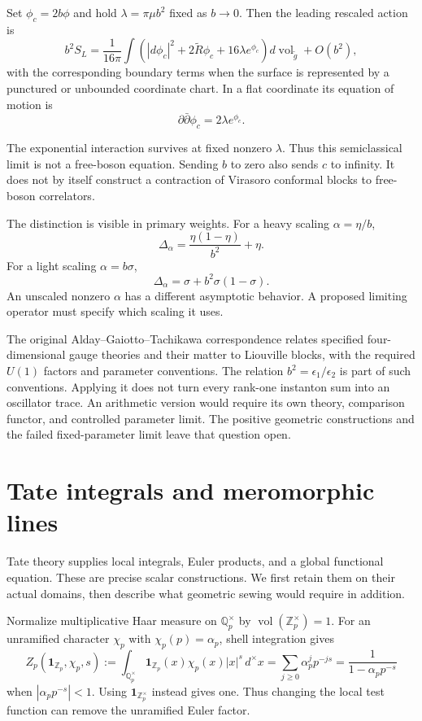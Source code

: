Set $\phi_c=2b\phi$ and hold $\lambda=\pi\mu b^2$ fixed as $b\to0$. Then the
leading rescaled action is
\[
 b^2S_L=
 \frac1{16\pi}\int
   \left(|d\phi_c|^2+2\widetilde R\phi_c+
                    16\lambda e^{\phi_c}\right)
                   d\operatorname{vol}_{\widetilde g}
   +O(b^2),
\]
with the corresponding boundary terms when the surface is represented by a
punctured or unbounded coordinate chart. In a flat coordinate its equation
of motion is
\[
 \partial\bar\partial\phi_c=2\lambda e^{\phi_c}.
\]

The exponential interaction survives at fixed nonzero $\lambda$. Thus this
semiclassical limit is not a free-boson equation. Sending $b$ to zero also
sends $c$ to infinity. It does not by itself construct a contraction of
Virasoro conformal blocks to free-boson correlators.

The distinction is visible in primary weights. For a heavy scaling
$\alpha=\eta/b$,
\[
 \Delta_\alpha=\frac{\eta(1-\eta)}{b^2}+\eta.
\]
For a light scaling $\alpha=b\sigma$,
\[
 \Delta_\alpha=\sigma+b^2\sigma(1-\sigma).
\]
An unscaled nonzero $\alpha$ has a different asymptotic behavior. A proposed
limiting operator must specify which scaling it uses.

The original Alday--Gaiotto--Tachikawa correspondence relates specified
four-dimensional gauge theories and their matter to Liouville blocks, with
the required $U(1)$ factors and parameter conventions. The relation
$b^2=\epsilon_1/\epsilon_2$ is part of such conventions. Applying it does
not turn every rank-one instanton sum into an oscillator trace. An
arithmetic version would require its own theory, comparison functor, and
controlled parameter limit. The positive geometric constructions and the
failed fixed-parameter limit leave that question open.

\section{Tate integrals and meromorphic lines}

Tate theory supplies local integrals, Euler products, and a global
functional equation. These are precise scalar constructions. We first retain
them on their actual domains, then describe what geometric sewing would
require in addition.

Normalize multiplicative Haar measure on $\mathbb Q_p^\times$ by
$\operatorname{vol}(\mathbb Z_p^\times)=1$. For an unramified character
$\chi_p$ with $\chi_p(p)=\alpha_p$, shell integration gives
\[
 Z_p(\mathbf1_{\mathbb Z_p},\chi_p,s)
  :=\int_{\mathbb Q_p^\times}
       \mathbf1_{\mathbb Z_p}(x)\chi_p(x)|x|^s\,d^\times x
  =\sum_{j\geq0}\alpha_p^jp^{-js}
  =\frac1{1-\alpha_pp^{-s}}
\]
when $|\alpha_pp^{-s}|<1$. Using $\mathbf1_{\mathbb Z_p^\times}$ instead
gives one. Thus changing the local test function can remove the unramified
Euler factor.

